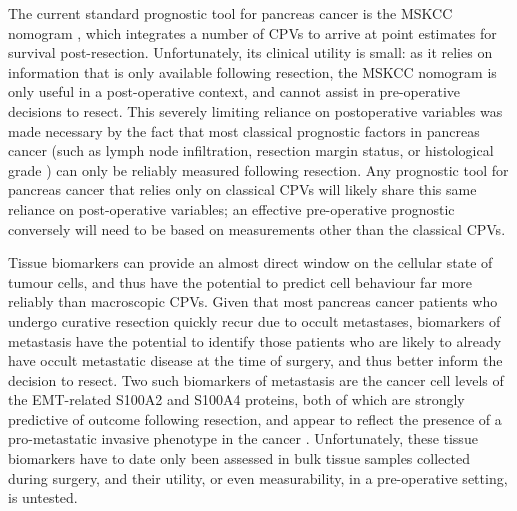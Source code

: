 \documentclass[dissertation.tex]{subfiles}
\begin{document}
The current standard prognostic tool for pancreas cancer is the \gls{MSKCC} nomogram \cite{Brennan2004}, which integrates a number of \glspl{CPV} to arrive at point estimates for survival post-resection.  Unfortunately, its clinical utility is small: as it relies on information that is only available following resection, the \gls{MSKCC} nomogram is only useful in a post-operative context, and cannot assist in pre-operative decisions to resect.  This severely limiting reliance on postoperative variables was made necessary by the fact that most classical prognostic factors in pancreas cancer (such as lymph node infiltration, resection margin status, or histological grade \cite{Bilici2014}) can only be reliably measured following resection.  Any prognostic tool for pancreas cancer that relies only on classical \glspl{CPV} will likely share this same reliance on post-operative variables; an effective pre-operative prognostic conversely will need to be based on measurements other than the classical \glspl{CPV}.

Tissue biomarkers can provide an almost direct window on the cellular state of tumour cells, and thus have the potential to predict cell behaviour far more reliably than macroscopic \glspl{CPV}.  Given that most pancreas cancer patients who undergo curative resection quickly recur due to occult metastases, biomarkers of metastasis have the potential to identify those patients who are likely to already have occult metastatic disease at the time of surgery, and thus better inform the decision to resect.  Two such biomarkers of metastasis are the cancer cell levels of the \gls{EMT}-related S100A2 and S100A4 proteins, both of which are strongly predictive of outcome following resection, and appear to reflect the presence of a pro-metastatic invasive phenotype in the cancer \cite{Biankin2008, Tsukamoto2013, Lee2014}.  Unfortunately, these tissue biomarkers have to date only been assessed in bulk tissue samples collected during surgery, and their utility, or even measurability, in a pre-operative setting, is untested.
\end{document}
